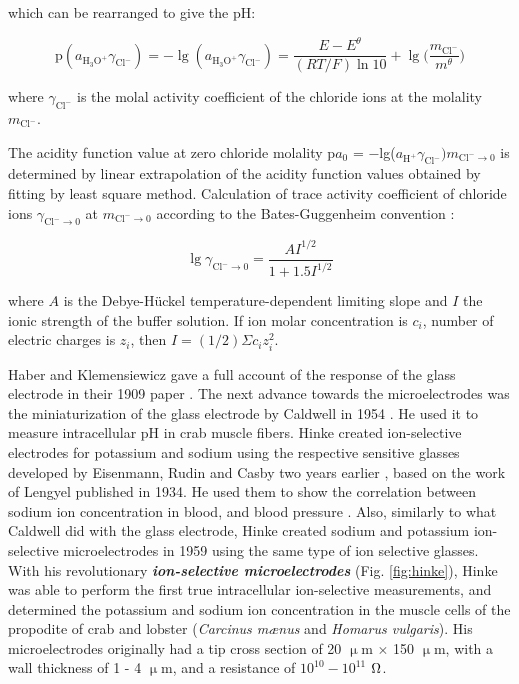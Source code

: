which can be rearranged to give the pH:

\begin{equation}
\textrm{p}(a_{\textrm{H}_3\textrm{O}^+}\gamma_{\textrm{Cl}^-}) = -\lg(a_{\textrm{H}_3\textrm{O}^+}\gamma_{\textrm{Cl}^-}) = \frac{E - E^\theta}{(RT/F)\ln10} + \lg \bigg(\frac{m_{\textrm{Cl}^-}}{m^\theta}\bigg)
\end{equation}

where $\gamma_{\textrm{Cl}^-}$ is the molal activity coefficient of the chloride ions at the molality $m_{\textrm{Cl}^-}$.

The acidity function value at zero chloride molality p$a_0$ = $-$lg($a_{\textrm{H}^+} \gamma _{\textrm{Cl}^-})m_{\textrm{Cl}^- \to 0}$  is determined by linear extrapolation of the acidity function values obtained by fitting by least square method.
Calculation of trace activity coefficient of chloride ions $\gamma_{\textrm{Cl}^- \to 0}$ at $m_{\textrm{Cl}^- \to 0}$ according to the Bates-Guggenheim convention \cite{bates1960report}:

\begin{equation}
\lg \gamma_{\textrm{Cl}^- \to 0} = \frac{A I^{1/2}}{1 + 1.5I^{1/2}}
\end{equation}

where $A$ is the Debye-Hückel temperature-dependent limiting slope and $I$ the ionic strength of the buffer solution.
If ion molar concentration is $c_i$, number of electric charges is $z_i$, then $I = (1/2) \Sigma c_i z_{i}^{2}$.

Haber and Klemensiewicz gave a full account of the response of the glass electrode in their 1909 paper \cite{haber1909elektrische, haber1909concerning}.
The next advance towards the microelectrodes was the miniaturization of the glass electrode by Caldwell in 1954 \cite{caldwell1954investigation}.
He used it to measure intracellular pH in crab muscle fibers.
Hinke created ion-selective electrodes for potassium and sodium using the respective sensitive glasses developed by Eisenmann, Rudin and Casby two years earlier \cite{eisenman1957glass}, based on the work of Lengyel \cite{lengyel1934behaviour} published in 1934.
He used them to show the correlation between sodium ion concentration in blood, and blood pressure \cite{friedman1958use, friedman1959drug}.
Also, similarly to what Caldwell did with the glass electrode, Hinke created sodium and potassium ion-selective microelectrodes in 1959 \cite{hinke1959glass} using the same type of ion selective glasses.
With his revolutionary \textbf{\emph{ion-selective microelectrodes}} (Fig. \ref{fig:hinke}), Hinke was able to perform the first true intracellular ion-selective measurements, and determined the potassium and sodium ion concentration in the muscle cells of the propodite of crab and lobster (\emph{Carcinus m\ae nus} and \emph{Homarus vulgaris}).
His microelectrodes originally had a tip cross section of 20 $\upmu$m $\times$ 150 $\upmu$m, with a wall thickness of 1 - 4 $\upmu$m, and a resistance of $10^{10} - 10^{11}$ $\ohm$.

